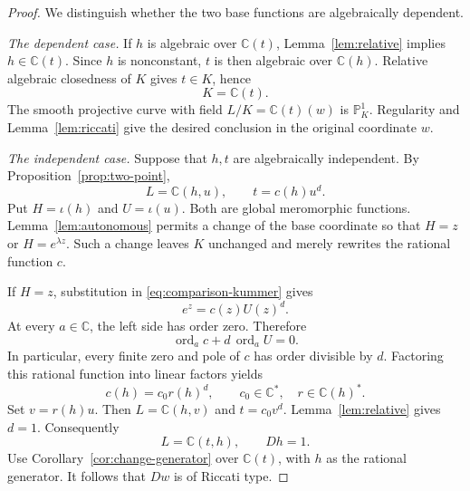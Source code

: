 \documentclass[11pt,reqno]{amsart}
\numberwithin{equation}{section}
\theoremstyle{definition}
\theoremstyle{remark}
\newcommand{\C}{\mathbb C}
\newcommand{\PP}{\mathbb P}
\newcommand{\ord}{\operatorname{ord}}
\begin{document}
\begin{proof}
We distinguish whether the two base functions are algebraically
dependent.

\smallskip\noindent
\emph{The dependent case.}
If $h$ is algebraic over $\C(t)$, Lemma~\ref{lem:relative} implies
$h\in\C(t)$. Since $h$ is nonconstant, $t$ is then algebraic over
$\C(h)$. Relative algebraic closedness of $K$ gives $t\in K$, hence
\begin{equation}
 K=\C(t).
 \label{eq:equal-bases}
\end{equation}
The smooth projective curve with field $L/K=\C(t)(w)$ is
$\PP^1_K$. Regularity and Lemma~\ref{lem:riccati} give the desired
conclusion in the original coordinate $w$.

\smallskip\noindent
\emph{The independent case.}
Suppose that $h,t$ are algebraically independent. By
Proposition~\ref{prop:two-point},
\begin{equation}
 L=\C(h,u),\qquad t=c(h)u^d.
 \label{eq:comparison-kummer}
\end{equation}
Put $H=\iota(h)$ and $U=\iota(u)$. Both are global meromorphic
functions. Lemma~\ref{lem:autonomous} permits a change of the base
coordinate so that $H=z$ or $H=e^{\lambda z}$. Such a change leaves
$K$ unchanged and merely rewrites the rational function $c$.

If $H=z$, substitution in \eqref{eq:comparison-kummer} gives
\begin{equation}
 e^z=c(z)U(z)^d.
 \label{eq:additive-divisor-identity}
\end{equation}
At every $a\in\C$, the left side has order zero. Therefore
\[
 \ord_a c+d\,\ord_a U=0.
\]
In particular, every finite zero and pole of $c$ has order divisible
by $d$. Factoring this rational function into linear factors yields
\begin{equation}
 c(h)=c_0r(h)^d,
 \qquad c_0\in\C^*,\quad r\in\C(h)^*.
 \label{eq:additive-divisibility}
\end{equation}
Set $v=r(h)u$. Then $L=\C(h,v)$ and $t=c_0v^d$.
Lemma~\ref{lem:relative} gives $d=1$. Consequently
\begin{equation}
 L=\C(t,h),\qquad Dh=1.
 \label{eq:additive-product}
\end{equation}
Use Corollary~\ref{cor:change-generator} over $\C(t)$, with $h$ as
the rational generator. It follows that $Dw$ is of Riccati type.


\end{proof}
\end{document}
